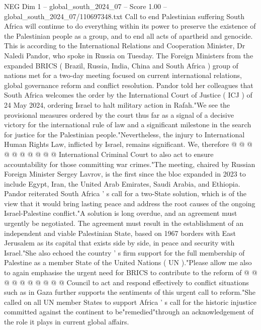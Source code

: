 \begin{textsample}{NEG Dim 1 – global\_south\_2024\_07 – Score 1.00 – global\_south\_2024\_07/110697348.txt}  \label{ex:f1_neg_270}
Call to end Palestinian suffering South Africa will continue to do everything within its power to preserve the existence of the Palestinian people as a group, and to end all acts of apartheid and genocide.
This is according to the International Relations and Cooperation Minister, Dr Naledi Pandor, who spoke in Russia on Tuesday.
The Foreign Ministers from the expanded BRICS ( Brazil, Russia, India, China and South Africa ) group of nations met for a two-day meeting focused on current international relations, global governance reform and conflict resolution.
Pandor told her colleagues that South Africa welcomes the order by the International Court of Justice ( ICJ ) of 24 May 2024, ordering Israel to halt military action in Rafah."We see the provisional measures ordered by the court thus far as a signal of a decisive victory for the international rule of law and a significant milestone in the search for justice for the Palestinian people."Nevertheless, the injury to International Human Rights Law, inflicted by Israel, remains significant.
We, therefore @ @ @ @ @ @ @ @ @ @ International Criminal Court to also act to ensure accountability for those committing war crimes."The meeting, chaired by Russian Foreign Minister Sergey Lavrov, is the first since the bloc expanded in 2023 to include Egypt, Iran, the United Arab Emirates, Saudi Arabia, and Ethiopia.
Pandor reiterated South Africa ' s call for a two-State solution, which is of the view that it would bring lasting peace and address the root causes of the ongoing Israel-Palestine conflict."A solution is long overdue, and an agreement must urgently be negotiated.
The agreement must result in the establishment of an independent and viable Palestinian State, based on 1967 borders with East Jerusalem as its capital that exists side by side, in peace and security with Israel."She also echoed the country ' s firm support for the full membership of Palestine as a member State of the United Nations ( UN )."Please allow me also to again emphasise the urgent need for BRICS to contribute to the reform of @ @ @ @ @ @ @ @ @ @ Council to act and respond effectively to conflict situations such as in Gaza further supports the sentiments of this urgent call to reform."She called on all UN member States to support Africa ' s call for the historic injustice committed against the continent to be"remedied"through an acknowledgement of the role it plays in current global affairs.

\end{textsample}
